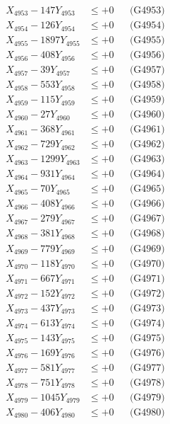 \documentclass[a4paper,10pt]{article}
\begin{document}
{\begin{align}
X_{4953} - 147Y_{4953} &\leq +0 && \text{(G4953)} \\
X_{4954} - 126Y_{4954} &\leq +0 && \text{(G4954)} \\
X_{4955} - 1897Y_{4955} &\leq +0 && \text{(G4955)} \\
X_{4956} - 408Y_{4956} &\leq +0 && \text{(G4956)} \\
X_{4957} - 39Y_{4957} &\leq +0 && \text{(G4957)} \\
X_{4958} - 553Y_{4958} &\leq +0 && \text{(G4958)} \\
X_{4959} - 115Y_{4959} &\leq +0 && \text{(G4959)} \\
X_{4960} - 27Y_{4960} &\leq +0 && \text{(G4960)} \\
\allowbreak
X_{4961} - 368Y_{4961} &\leq +0 && \text{(G4961)} \\
X_{4962} - 729Y_{4962} &\leq +0 && \text{(G4962)} \\
X_{4963} - 1299Y_{4963} &\leq +0 && \text{(G4963)} \\
X_{4964} - 931Y_{4964} &\leq +0 && \text{(G4964)} \\
X_{4965} - 70Y_{4965} &\leq +0 && \text{(G4965)} \\
X_{4966} - 408Y_{4966} &\leq +0 && \text{(G4966)} \\
X_{4967} - 279Y_{4967} &\leq +0 && \text{(G4967)} \\
X_{4968} - 381Y_{4968} &\leq +0 && \text{(G4968)} \\
X_{4969} - 779Y_{4969} &\leq +0 && \text{(G4969)} \\
X_{4970} - 118Y_{4970} &\leq +0 && \text{(G4970)} \\
\allowbreak
X_{4971} - 667Y_{4971} &\leq +0 && \text{(G4971)} \\
X_{4972} - 152Y_{4972} &\leq +0 && \text{(G4972)} \\
X_{4973} - 437Y_{4973} &\leq +0 && \text{(G4973)} \\
X_{4974} - 613Y_{4974} &\leq +0 && \text{(G4974)} \\
X_{4975} - 143Y_{4975} &\leq +0 && \text{(G4975)} \\
X_{4976} - 169Y_{4976} &\leq +0 && \text{(G4976)} \\
X_{4977} - 581Y_{4977} &\leq +0 && \text{(G4977)} \\
X_{4978} - 751Y_{4978} &\leq +0 && \text{(G4978)} \\
X_{4979} - 1045Y_{4979} &\leq +0 && \text{(G4979)} \\
X_{4980} - 406Y_{4980} &\leq +0 && \text{(G4980)} \\

\end{align}}
\end{document}
